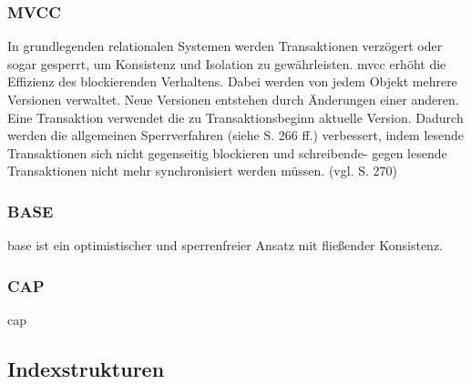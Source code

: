 \subsubsection{MVCC}
In grundlegenden relationalen Systemen werden Transaktionen verzögert oder sogar gesperrt, um Konsistenz und Isolation zu gewährleisten.
\Gls{mvcc} erhöht die Effizienz des  blockierenden Verhaltens.
Dabei werden von jedem Objekt mehrere Versionen verwaltet.
Neue Versionen entstehen durch Änderungen einer anderen.
Eine Transaktion verwendet die zu Transaktionsbeginn aktuelle Version.
Dadurch werden die allgemeinen Sperrverfahren (siehe \cite{book:kudrass} S. 266 ff.) verbessert, indem lesende Transaktionen sich nicht gegenseitig blockieren und schreibende- gegen lesende Transaktionen nicht mehr synchronisiert werden müssen. (vgl. \cite{book:kudrass} S. 270)

\subsubsection{BASE}
\Gls{base} ist ein optimistischer und sperrenfreier Ansatz mit fließender Konsistenz.
\cite{book:nosql-einfuehrung}

\subsubsection{CAP}
\Gls{cap}






\subsection{Indexstrukturen}


